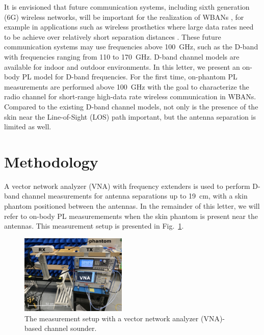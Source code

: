 \documentclass[preprint]{rsl}
\begin{document}
It is envisioned that future communication systems, including sixth generation (6G) wireless networks, will be important for the realization of WBANs \cite{Cornet2022}, for example in applications such as wireless prosthetics where large data rates need to be achieve over relatively short separation distances \cite{Proesmans2022}.
These future communication systems may use frequencies above 100~GHz, such as the D-band with frequencies ranging from 110 to 170~GHz.
D-band channel models are available for indoor \cite{DeBeelde2021_access, Pometcu2020} and outdoor \cite{DeBeelde2022_tap,DeBeelde2022_wcl} environments. 
In this letter, we present an on-body PL model for D-band frequencies. 
For the first time, on-phantom PL measurements are performed above 100~GHz with the goal to characterize the radio channel for short-range high-data rate wireless communication in WBANs.
Compared to the existing D-band channel models, not only is the presence of the skin near the Line-of-Sight (LOS) path important, but the antenna separation is limited as well. 


\section{Methodology \label{sect:method}}

A vector network analyzer (VNA) with frequency extenders is used to perform D-band channel measurements for antenna separations up to 19~cm, with a skin phantom positioned between the antennas.
In the remainder of this letter, we will refer to on-body PL measuremements when the skin phantom is present near the antennas. 
This measurement setup is presented in Fig.~\ref{fig:sounder_setup}.
\begin{figure}[tb]
\begin{center}
	\includegraphics[width=0.45\textwidth]{figures/measurement_setup}
\caption{The measurement setup with a vector network analyzer (VNA)-based channel sounder.}
\label{fig:sounder_setup}
\end{center}
\end{figure}
\end{document}
